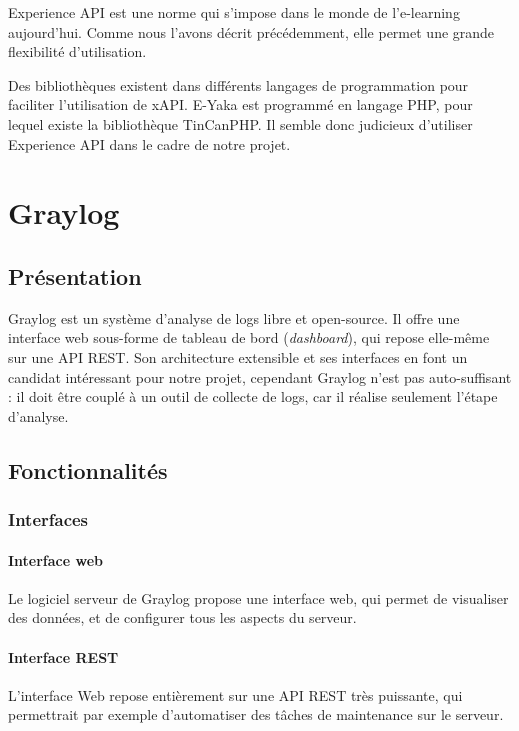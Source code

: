             Experience API est une norme qui s’impose dans le monde de l’e-learning aujourd’hui. Comme nous l’avons décrit précédemment, elle permet une grande flexibilité d’utilisation.

            Des bibliothèques existent dans différents langages de programmation pour faciliter l’utilisation de xAPI. E-Yaka est programmé en langage PHP, pour lequel existe la bibliothèque TinCanPHP. Il semble donc judicieux d’utiliser Experience API dans le cadre de notre projet.


    \section{Graylog}

        \subsection{Présentation}
    
            Graylog est un système d'analyse de logs libre et open-source. Il offre une interface web sous-forme de tableau de bord (\emph{dashboard}), qui repose elle-même sur une API REST. Son architecture extensible et ses interfaces en font un candidat intéressant pour notre projet, cependant Graylog n'est pas auto-suffisant : il doit être couplé à un outil de collecte de logs, car il réalise seulement l'étape d'analyse.
    

        \subsection{Fonctionnalités}

            \subsubsection{Interfaces}

                \paragraph{Interface web}
                    Le logiciel serveur de Graylog propose une interface web, qui permet de visualiser des données, et de configurer tous les aspects du serveur.
                
                \paragraph{Interface REST}
                    L'interface Web repose entièrement sur une API REST très puissante, qui permettrait par exemple d'automatiser des tâches de maintenance sur le serveur.

